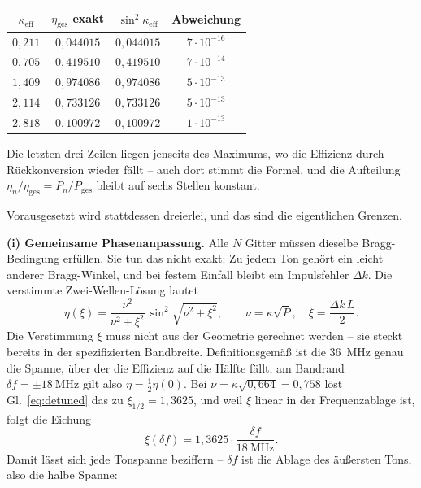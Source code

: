 \documentclass[11pt,a4paper]{article}
\begin{document}
\begin{center}
\begin{tabular}{cccc}
  \toprule
  $\kappa_\mathrm{eff}$ & $\eta_\mathrm{ges}$ exakt & $\sin^2\kappa_\mathrm{eff}$ & Abweichung\\
  \midrule
  $0{,}211$ & $0{,}044015$ & $0{,}044015$ & $7\cdot10^{-16}$\\
  $0{,}705$ & $0{,}419510$ & $0{,}419510$ & $7\cdot10^{-14}$\\
  $1{,}409$ & $0{,}974086$ & $0{,}974086$ & $5\cdot10^{-13}$\\
  $2{,}114$ & $0{,}733126$ & $0{,}733126$ & $5\cdot10^{-13}$\\
  $2{,}818$ & $0{,}100972$ & $0{,}100972$ & $1\cdot10^{-13}$\\
  \bottomrule
\end{tabular}
\end{center}

\noindent Die letzten drei Zeilen liegen jenseits des Maximums, wo die
Effizienz durch Rückkonversion wieder fällt -- auch dort stimmt die Formel,
und die Aufteilung $\eta_n/\eta_\mathrm{ges} = P_n/P_\mathrm{ges}$ bleibt auf
sechs Stellen konstant.

Vorausgesetzt wird stattdessen dreierlei, und das sind die eigentlichen
Grenzen.

\medskip
\noindent\textbf{(i) Gemeinsame Phasenanpassung.} Alle $N$ Gitter müssen
dieselbe Bragg-Bedingung erfüllen. Sie tun das nicht exakt: Zu jedem Ton
gehört ein leicht anderer Bragg-Winkel, und bei festem Einfall bleibt ein
Impulsfehler $\Delta k$. Die verstimmte Zwei-Wellen-Lösung lautet
\begin{equation}
  \eta(\xi) = \frac{\nu^2}{\nu^2+\xi^2}\,\sin^2\!\sqrt{\nu^2+\xi^2} ,
  \qquad \nu = \kappa\sqrt{P},\quad \xi = \frac{\Delta k\,L}{2} .
  \label{eq:detuned}
\end{equation}
Die Verstimmung $\xi$ muss nicht aus der Geometrie gerechnet werden -- sie
steckt bereits in der spezifizierten Bandbreite. Definitionsgemäß ist die
\SI{36}{\mega\hertz} genau die Spanne, über der die Effizienz auf die Hälfte
fällt; am Bandrand $\delta f = \pm\SI{18}{\mega\hertz}$ gilt also
$\eta=\tfrac12\eta(0)$. Bei $\nu=\kappa\sqrt{0{,}664}=0{,}758$ löst
Gl.~\eqref{eq:detuned} das zu $\xi_{1/2}=1{,}3625$, und weil $\xi$ linear in
der Frequenzablage ist, folgt die Eichung
\begin{equation}
  \xi(\delta f) = 1{,}3625\cdot\frac{\delta f}{\SI{18}{\mega\hertz}} .
\end{equation}
Damit lässt sich jede Tonspanne beziffern -- $\delta f$ ist die Ablage des
äußersten Tons, also die halbe Spanne:
\end{document}
